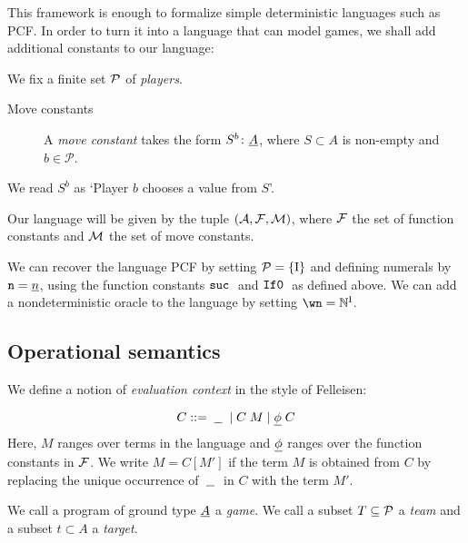 \documentclass{article}
\begin{document}
This framework is enough to formalize simple deterministic languages such as PCF.  In order to turn it into a language that can model games, we shall add additional constants to our language:

\begin{definition}
  We fix a finite set $\P$ of \emph{players}.  
  
  \begin{description}
    \item[Move constants] A \emph{move constant} takes the form $S^b\from \ul{A}$, where $S\subset A$ is non-empty and $b\in\mathcal P$.
  \end{description}

  We read $S^b$ as `Player $b$ chooses a value from $S$'.

  Our language will be given by the tuple $(\A,\F, \M)$, where $\F$ the set of function constants and $\M$ the set of move constants.
\end{definition}

\begin{example}
  We can recover the language PCF by setting $\P = \{\RN{1}\}$ and defining numerals by $\n=\ul{n}$, using the function constants $\suc$ and $\IfO$ as defined above.  We can add a nondeterministic oracle to the language by setting $\wn = \bN^\RN{1}$.
\end{example}

\subsection{Operational semantics}

We define a notion of \emph{evaluation context} in the style of Felleisen:

\[
  C ::= \hole \mid C\; M\mid\ul{\phi}\;C
  \]
Here, $M$ ranges over terms in the language and $\ul{\phi}$ ranges over the function constants in $\F$.  We write $M=C[M']$ if the term $M$ is obtained from $C$ by replacing the unique occurrence of $\hole$ in $C$ with the term $M'$.

We call a program of ground type $\ul{A}$ a \emph{game}.  We call a subset $T\subset\P$ a \emph{team} and a subset $t\subset A$ a \emph{target}.
\end{document}
